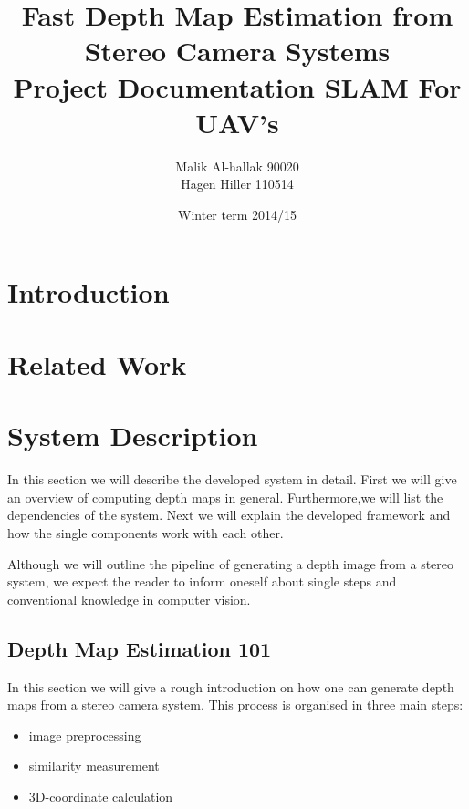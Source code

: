 \documentclass[11pt]{article}
\title{\textbf{Fast Depth Map Estimation from Stereo Camera Systems}\\Project Documentation SLAM For UAV's}
\author{Malik Al-hallak 90020\\
		Hagen Hiller 110514 }
\date{Winter term 2014/15}
\begin{document}
\maketitle



\section{Introduction}
\section{Related Work}
\section{System Description}
In this section we will describe the developed system in detail. First we will give an overview of computing depth maps in general. Furthermore,we will list the dependencies of the system. Next we will explain the developed framework and how the single components work with each other.

Although we will outline the pipeline of generating a depth image from a stereo system, we expect the reader to inform oneself about single steps and conventional knowledge in computer vision.

\subsection{Depth Map Estimation 101}\label{sec:101}
In this section we will give a rough introduction on how one can generate depth maps from a stereo camera system. This process is organised in three main steps:
\begin{itemize}
	\item image preprocessing
	\item similarity measurement
	\item 3D-coordinate calculation
\end{itemize}
\end{document}
